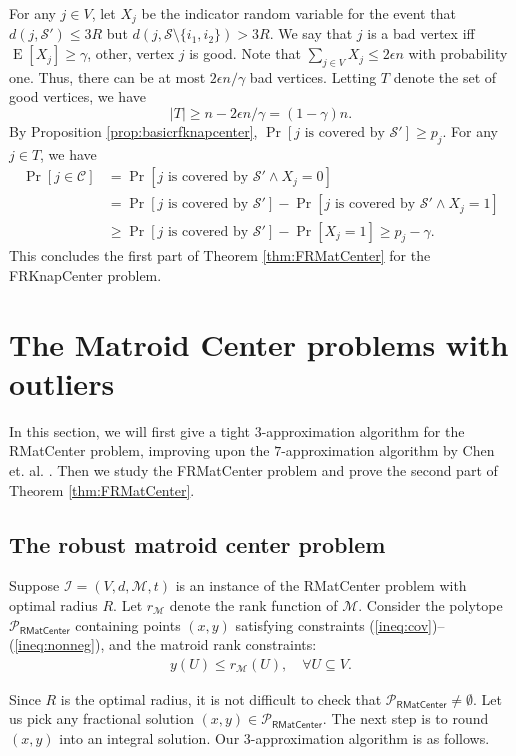 \documentclass[a4paper,11pt]{article}
\DeclareMathOperator*{\E}{\mathrm{E}}
\newcommand{\C}{\mathcal{C}}
\renewcommand{\S}{\mathcal{S}}
\newcommand{\I}{\mathcal{I}}
\newcommand{\M}{\mathcal{M}}
\renewcommand{\P}{\mathcal{P}}
\begin{document}
For any $j \in V$, let $X_j$ be the indicator random variable for the event that $d(j, \S') \leq 3 R$ but $d(j, \S \setminus \{i_1, i_2 \}) > 3 R$. We say that $j$ is a bad vertex iff $\E[X_j] \geq \gamma$, other, vertex $j$ is good. Note that $\sum_{j \in V} X_j \leq 2\epsilon n$ with probability one. Thus, there can be at most $2\epsilon n / \gamma$ bad vertices. Letting $T$ denote the set of good vertices, we have
$$|T| \geq n - 2\epsilon n/\gamma = (1-\gamma)n.$$ 
By Proposition \ref{prop:basicrfknapcenter}, $\Pr[j \text{ is covered by }\S'] \geq p_j$. For any $j \in T$, we have
\begin{align*}
	\Pr[j \in \C] &= \Pr[j \text{ is covered by }\S' \wedge X_j = 0] \\ 
		&= \Pr[j \text{ is covered by }\S'] - \Pr[j \text{ is covered by }\S' \wedge X_j = 1] \\ 
		&\geq \Pr[j \text{ is covered by }\S'] - \Pr[X_j = 1] \geq p_j - \gamma.
\end{align*}
This concludes the first part of Theorem \ref{thm:FRMatCenter} for the \textsf{FRKnapCenter} problem.



\section{The Matroid Center problems with outliers}
In this section, we will first give a tight $3$-approximation algorithm for the \textsf{RMatCenter} problem, improving upon the $7$-approximation algorithm by Chen et. al. \cite{jianli_kc}. Then we study the \textsf{FRMatCenter} problem and prove the second part of Theorem \ref{thm:FRMatCenter}.


\subsection{The robust matroid center problem}
Suppose $\I = (V, d, \M, t)$ is an instance of the \textsf{RMatCenter} problem with optimal radius $R$. Let $r_\M$ denote the rank function of $\M$. Consider the polytope $\P_\textsf{RMatCenter}$ containing points $(x, y)$ satisfying constraints (\ref{ineq:cov})--(\ref{ineq:nonneg}), and the matroid rank constraints:
\begin{align}
	 y(U) \leq r_\M(U), \quad \forall U \subseteq V. \label{ineq:matroid}
\end{align}

Since $R$ is the optimal radius, it is not difficult to check that $\P_\textsf{RMatCenter} \neq \emptyset$. Let us pick any fractional solution $(x,y) \in \P_\textsf{RMatCenter}$. The next step is to round $(x,y)$ into an integral solution. Our $3$-approximation algorithm is as follows.
\end{document}
